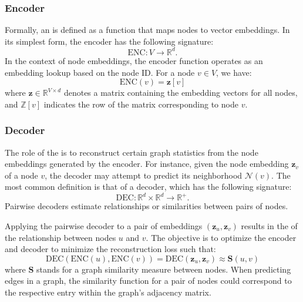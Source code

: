 

\subsubsection{Encoder}
Formally, an  is defined as a function that maps nodes to vector embeddings. In its simplest form, the encoder has the following signature:
\begin{equation*}
    \text{ENC}: V \to \mathbb{R}^d.
\end{equation*}
In the context of  node embeddings, the encoder function operates as an embedding lookup based on the node ID. For a node $ v\in V $, we have:
\begin{equation}\label{eq:encoderLookup}
    \text{ENC}(v) = \mathbf{z}[v]
\end{equation}
where $ \mathbf{z}\in \mathbb{R}^{V\times d} $ denotes a matrix containing the embedding vectors for all nodes, and $ \mathbb{Z}[v] $ indicates the row of the matrix corresponding to node $ v $.

\subsubsection{Decoder}\label{sec:decoder}
The role of the  is to reconstruct certain graph statistics from the node embeddings generated by the encoder. For instance, given the node embedding $ \mathbf{z}_v $ of a node $ v $, the decoder may attempt to predict its neighborhood $ \mathcal{N}(v) $. The most common definition is that of a  decoder, which has the following signature:
\begin{equation*}
    \text{DEC}: \mathbb{R}^d \times \mathbb{R}^d \to \mathbb{R}^+.
\end{equation*}
Pairwise decoders estimate relationships or similarities between pairs of nodes. 

Applying the pairwise decoder to a pair of embeddings $ (\mathbf{z}_u, \mathbf{z}_v) $ results in the  of the relationship between nodes $ u $ and $ v $. The objective is to optimize the encoder and decoder to minimize the reconstruction loss such that:
\begin{equation}\label{eq:reconstruction}
    \text{DEC}(\text{ENC}(u), \text{ENC}(v)) = \text{DEC}(\mathbf{z}_u, \mathbf{z}_v) \approx \textbf{S}(u,v)
\end{equation}
where $ \textbf{S} $ stands for a graph similarity measure between nodes. When predicting edges in a graph, the similarity function for a pair of nodes could correspond to the respective entry within the graph's adjacency matrix.

